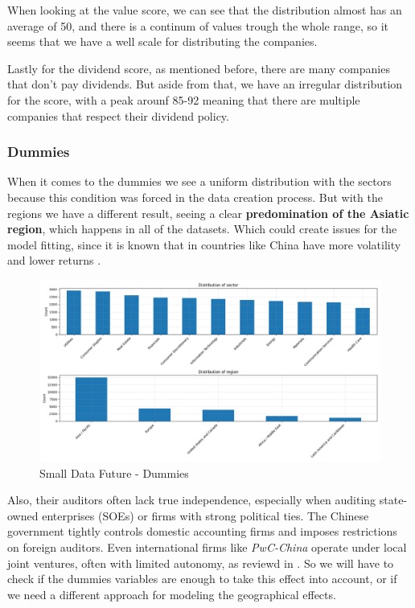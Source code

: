 \documentclass[11pt,english,a4paper,hidelinks]{book}
\begin{document}
\vspace{0.5cm}
\noindent When looking at the value score, we can see that the distribution almost has an average of 50, and there is a continum of values trough the whole range, so it seems that we have a well scale for distributing the companies.

\vspace{0.5cm}
\noindent Lastly for the dividend score, as mentioned before, there are many companies that don't pay dividends. But aside from that, we have an irregular distribution for the score, with a peak arounf 85-92 meaning that there are multiple companies that respect their dividend policy.

\subsubsection{Dummies}

When it comes to the dummies we see a uniform distribution with the sectors because this condition was forced in the data creation process. But with the regions we have a different result, seeing a clear \textbf{predomination of the Asiatic region}, which happens in all of the datasets. Which could create issues for the model fitting, since it is known that in countries like China have more volatility and lower returns \textcite{chen2024economic}.

\begin{figure}[H]
    \centering
    \includegraphics[width=1\linewidth]{images/code/descriptive analysis/distributions/Small Data future - Dummies.png}
    \caption{Small Data Future - Dummies}
    \label{fig:small_future_dummies}
\end{figure}

\noindent  Also, their auditors often lack true independence, especially when auditing state-owned enterprises (SOEs) or firms with strong political ties. The Chinese government tightly controls domestic accounting firms and imposes restrictions on foreign auditors. Even international firms like \textit{PwC-China} operate under local joint ventures, often with limited autonomy, as reviewd in \textcite{LIU2012782}. So we will have to check if the dummies variables are enough to take this effect into account, or if we need a different approach for modeling the geographical effects.
\end{document}

